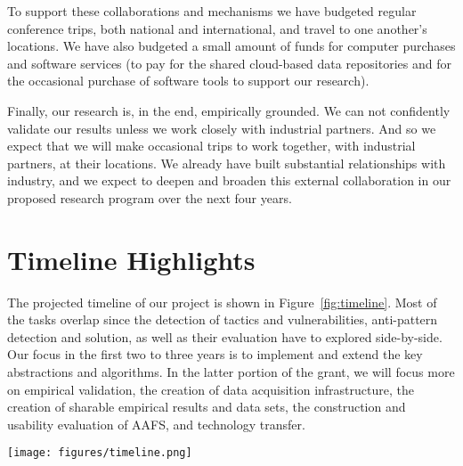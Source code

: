 To support these collaborations and mechanisms we have budgeted regular conference trips, both national and international, and travel to one another's locations.  We have also budgeted a small amount of funds for computer purchases and software services (to pay for the shared cloud-based data repositories and for the occasional purchase of software tools to support our research).  

Finally, our research is, in the end, empirically grounded.  We can not confidently validate our results unless we work closely with industrial partners.  And so we expect that we will make occasional trips to work together, with industrial partners, at their locations.  We already have built substantial relationships with industry, and we expect to deepen and broaden this  external collaboration in our proposed research program over the next four years.
\fi

\section{Timeline Highlights}
The projected timeline of our project is shown in Figure~\ref{fig:timeline}. Most of the tasks overlap since the detection of tactics and vulnerabilities, anti-pattern detection and solution, as well as their evaluation have to explored side-by-side.  Our focus in the first two to three years is to implement and extend the key abstractions and algorithms.  In the latter portion of the grant, we will focus more on empirical validation, the creation of data acquisition infrastructure, the creation of sharable empirical results and data sets,  the construction and usability evaluation of AAFS, and technology transfer.  


\begin{figure*}[ht]%
\centering
	\texttt{[image: figures/timeline.png]}
\caption{Project Timeline }
\label{fig:timeline}
\end{figure*}


